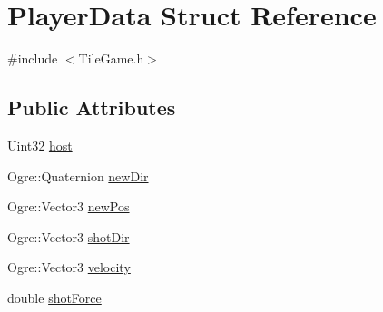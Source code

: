\hypertarget{structPlayerData}{\section{Player\-Data Struct Reference}
\label{structPlayerData}
}


{\ttfamily \#include $<$Tile\-Game.\-h$>$}

\subsection*{Public Attributes}
\begin{DoxyCompactItemize}
\item 
Uint32 \hyperlink{structPlayerData_afedaac99a073198e7347fb41df68bbdf}{host}
\item 
Ogre\-::\-Quaternion \hyperlink{structPlayerData_a1ba2a05ce9b43b34334163b84e975c4b}{new\-Dir}
\item 
Ogre\-::\-Vector3 \hyperlink{structPlayerData_ab63193631eb26d16924e7b81aab109be}{new\-Pos}
\item 
Ogre\-::\-Vector3 \hyperlink{structPlayerData_acab3f24dcc83136321f31dd719fb855e}{shot\-Dir}
\item 
Ogre\-::\-Vector3 \hyperlink{structPlayerData_a3c4941ad4f202eca640b912e25a67a9f}{velocity}
\item 
double \hyperlink{structPlayerData_a793f89049e5fbf15cefe903487a56265}{shot\-Force}
\end{DoxyCompactItemize}


